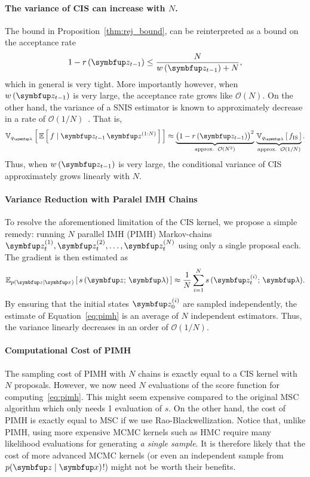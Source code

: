 \paragraph{The variance of CIS can increase with \(N\).}
The bound in Proposition~\ref{thm:rej_bound}, can be reinterpreted as a bound on the acceptance rate 
\begin{align}
  1 - r\,(\vz_{t-1}) \leq \frac{N}{ w\,(\vz_{t-1}) + N},
\end{align}
which in general is very tight.
More importantly however, when \(w\,(\vz_{t-1})\) is very large, the acceptance rate grows like \(\mathcal{O}(N)\).
On the other hand, the variance of a SNIS estimator is known to approximately decrease in a rate of \(\mathcal{O}(1/N)\)~\citep{kong_sequential_1994, robert_monte_2004, elvira_rethinking_2018}.
That is, 
\begin{align}
  \Vsub{q_{\vlambda}}{ \E{ f \mid \vz_{t-1}\,\vz^{(1:N)} } } \approx \underbrace{{\big(1 - r\,(\vz_{t-1})\big)}^2}_{\text{approx.}\;\;\mathcal{O}(N^2)} \,
  \underbrace{\Vsub{q_{\vlambda}}{ f_{\text{IS}} }}_{\text{approx.}\;\;\mathcal{O}(1/N)}.
\end{align}
Thus, when \(w\,(\vz_{t-1})\) is very large, the conditional variance of CIS approximately grows linearly with \(N\).

\paragraph{Variance Reduction with Paralel IMH Chains}
To resolve the aforementioned limitation of the CIS kernel, we propose a simple remedy: running \(N\) parallel IMH (PIMH) Markov-chains \(\vz_t^{(1)}, \vz_t^{(2)}, \ldots, \vz_t^{(N)}\) using only a single proposal each.
The gradient is then estimated as
\begin{align}
  \Esub{p(\vz\mid\vx)}{ s\,(\vz;\,\vlambda) } \approx \frac{1}{N} \sum_{i=1}^N s\,(\vz_t^{(i)};\,\vlambda).\label{eq:pimh}
\end{align}
By ensuring that the initial states \(\vz_{0}^{(i)}\) are sampled independently, the estimate of Equation~\eqref{eq:pimh} is an average of \(N\) independent estimators.
Thus, the variance linearly decreases in an order of \(\mathcal{O}(1/N)\).

\paragraph{Computational Cost of PIMH}
The sampling cost of PIMH with \(N\) chains is exactly equal to a CIS kernel with \(N\) proposals.
However, we now need \(N\) evaluations of the score function for computing~\eqref{eq:pimh}.
This might seem expensive compared to the original MSC algorithm which only needs 1 evaluation of \(s\).
On the other hand, the cost of PIMH is exactly equal to MSC if we use Rao-Blackwellization.
Notice that, unlike PIMH, using more expensive MCMC kernels such as HMC require many likelihood evaluations for generating \textit{a single sample}.
It is therefore likely that the cost of more advanced MCMC kernels (or even an independent sample from \(p(\vz\mid\vx)\)!) might not be worth their benefits.

